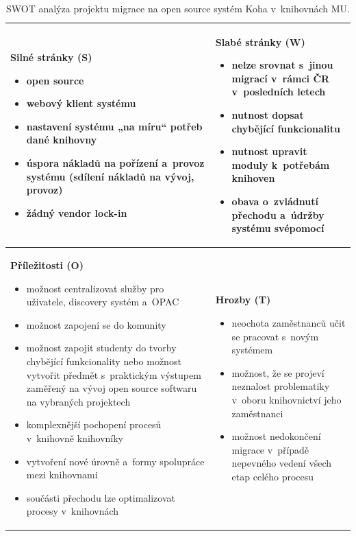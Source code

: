 \documentclass[
	11pt, oneside, printed, final, palatino
	microtype,
	table,   %
	lof,     %
	lot     %
]{fithesis3}
\newcommand{\bold}[1]{\textbf{#1}}
\begin{document}
{\begin{table}
    \centering
    \begin{tabular}{ p{5.8cm} | p{5.8cm} }
    \bold{Silné stránky (S)} 
    \begin{itemize}
		\item open source
		\item webový klient systému
		\item nastavení systému „na míru“ potřeb dané knihovny
		\item úspora nákladů na pořízení a~provoz systému (sdílení nákladů na vývoj, provoz)
		\item žádný vendor lock-in
	\end{itemize}
    & 
    \bold{Slabé stránky (W)} 
    \begin{itemize}
		\item nelze srovnat s~jinou migrací v~rámci ČR v~posledních letech
		\item nutnost dopsat chybějící funkcionalitu
		\item nutnost upravit moduly k~potřebám knihoven
		\item obava o~zvládnutí přechodu a~údržby systému svépomocí
	\end{itemize}
    \\ \hline
    
    \bold{Příležitosti (O)} 
    \begin{itemize}
		\item možnost centralizovat služby pro uživatele, discovery systém a~OPAC
		\item možnost zapojení se do komunity
		\item možnost zapojit studenty do tvorby chybějící funkcionality nebo možnost vytvořit předmět s~praktickým výstupem zaměřený na vývoj open source softwaru na vybraných projektech
		\item komplexnější pochopení procesů v~knihovně knihovníky
		\item vytvoření nové úrovně a~formy spolupráce mezi knihovnami
		\item součásti přechodu lze optimalizovat procesy v~knihovnách
	\end{itemize}
    & 
    \bold{Hrozby (T)} 
    \begin{itemize}
		\item neochota zaměstnanců učit se pracovat s~novým systémem
		\item možnost, že se projeví neznalost problematiky v~oboru knihovnictví jeho zaměstnanci
		\item možnost nedokončení migrace v~případě nepevného vedení všech etap celého procesu
	\end{itemize}
    \end{tabular}
    \caption{SWOT analýza projektu migrace na open source systém Koha v~knihovnách MU.}
\end{table}

}
\end{document}
